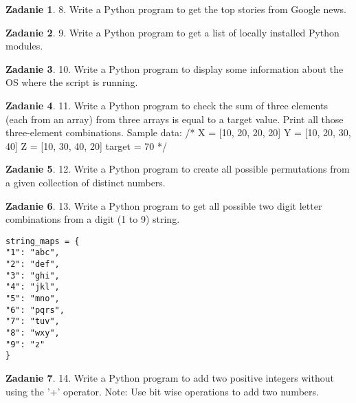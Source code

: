 \documentclass[11pt]{article}
\theoremstyle{definition}
\newtheorem{zadanie}{Zadanie}
\begin{document}
\begin{zadanie}


8. Write a Python program to get the top stories from Google news. 

\end{zadanie}

\begin{zadanie}


9. Write a Python program to get a list of locally installed Python modules. 

\end{zadanie}

\begin{zadanie}


10. Write a Python program to display some information about the OS where the script is running. 

\end{zadanie}

\begin{zadanie}


11. Write a Python program to check the sum of three elements (each from an array) from three arrays is equal to a target value. Print all those three-element combinations. 
Sample data:
/*
X = [10, 20, 20, 20]
Y = [10, 20, 30, 40]
Z = [10, 30, 40, 20]
target = 70
*/

\end{zadanie}

\begin{zadanie}


12. Write a Python program to create all possible permutations from a given collection of distinct numbers.

\end{zadanie}

\begin{zadanie}


13. Write a Python program to get all possible two digit letter combinations from a digit (1 to 9) string.

\begin{verbatim}
string_maps = {
"1": "abc",
"2": "def",
"3": "ghi",
"4": "jkl",
"5": "mno",
"6": "pqrs",
"7": "tuv",
"8": "wxy",
"9": "z"
}
\end{verbatim}

\end{zadanie}

\begin{zadanie}


14. Write a Python program to add two positive integers without using the '+' operator. 
Note: Use bit wise operations to add two numbers.

\end{zadanie}
\end{document}
